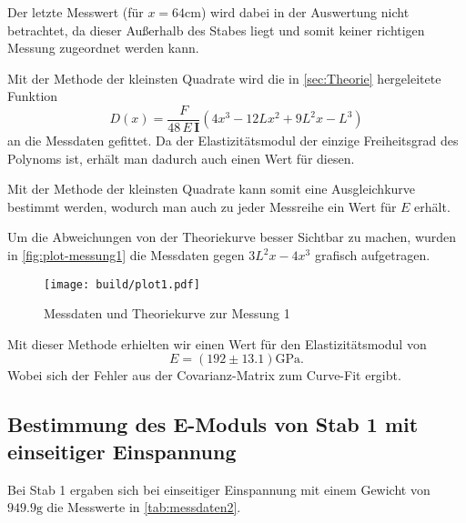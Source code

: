 Der letzte Messwert (für $x = 64\si{\centi\meter}$) wird dabei in der Auswertung nicht
betrachtet, da dieser Außerhalb des Stabes liegt und somit keiner richtigen Messung 
zugeordnet werden kann.

Mit der Methode der kleinsten Quadrate wird die in \autoref{sec:Theorie} hergeleitete
Funktion 
\begin{equation}
	D(x) = \frac{F}{48 \, E \, \mathbf{I}} \left(4x^3 - 12Lx^2 + 9L^2x - L^3 \right)
\end{equation}
an die Messdaten gefittet. Da der Elastizitätsmodul der einzige
Freiheitsgrad des Polynoms ist, erhält man dadurch auch einen Wert für diesen.

Mit der Methode der kleinsten Quadrate kann somit eine Ausgleichkurve bestimmt
werden, wodurch man auch zu jeder Messreihe ein Wert für $E$ erhält.

Um die Abweichungen von der Theoriekurve besser Sichtbar zu machen, 
wurden in \autoref{fig:plot-messung1} die Messdaten gegen $3L^2x - 4x^3$ grafisch 
aufgetragen.
\begin{figure}[H]
	\centering
	\texttt{[image: build/plot1.pdf]}
	\caption{Messdaten und Theoriekurve zur Messung 1}
	\label{fig:plot-messung1}
\end{figure}

Mit dieser Methode erhielten wir einen Wert für den Elastizitätsmodul von
\begin{equation}
	E = (192 \pm 13.1) \si{\giga\pascal}.
	\label{eqn:E-messung1}
\end{equation}
Wobei sich der Fehler aus der Covarianz-Matrix zum Curve-Fit ergibt.

\subsection{Bestimmung des E-Moduls von Stab 1 mit einseitiger Einspannung}
\label{sec:messung2}

Bei Stab 1 ergaben sich bei einseitiger Einspannung 
mit einem Gewicht von $949.9 \si{\gram}$ 
die Messwerte in \autoref{tab:messdaten2}.

